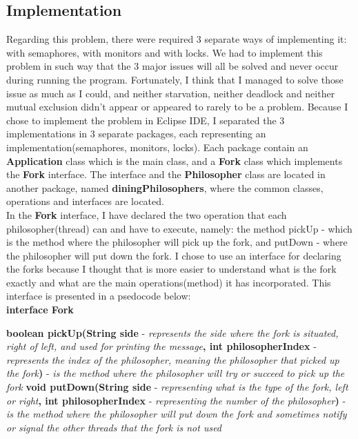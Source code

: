 \documentclass[14pt]{article}
\begin{document}
\subsection{Implementation}
Regarding this problem, there were required 3 separate ways of implementing it: with semaphores, with monitors and with locks. We had to implement this problem in such way that the 3 major issues will all be solved and never occur during running the program. Fortunately, I think that I managed to solve those issue as much as I could, and neither starvation, neither deadlock and neither mutual exclusion didn't appear or appeared to rarely to be a problem. Because I chose to implement the problem in Eclipse IDE, I separated the 3 implementations in 3 separate packages, each representing an implementation(semaphores, monitors, locks). Each package contain an \textbf{Application} class which is the main class, and a \textbf{Fork} class which implements the \textbf{Fork} interface. The interface and the \textbf{Philosopher} class are located in another package, named \textbf{diningPhilosophers}, where the common classes, operations and interfaces are located.
\\In the \textbf{Fork} interface, I have declared the two operation that each philosopher(thread) can and have to execute, namely: the method pickUp - which is the method where the philosopher will pick up the fork, and putDown - where the philosopher will put down the fork. I chose to use an interface for declaring the forks because I thought that is more easier to understand what is the fork exactly and what are the main operations(method) it has incorporated. This interface is presented in a psedocode below:
\vspace{2.5 mm}
\\\textbf{interface Fork}
\begin{algorithmic}
\State \textbf{boolean pickUp(String side} - \textit{represents the side where the fork is situated, right of left, and used for printing the message}\textbf{, int philosopherIndex} - \textit{represents the index of the philosopher, meaning the philosopher that picked up the fork}\textbf{)} - \textit{is the method where the philosopher will try or succeed to pick up the fork}
\State \textbf{void putDown(String side} - \textit{representing what is the type of the fork, left or right}\textbf{, int philosopherIndex} - \textit{representing the number of the philosopher}\textbf{)} - \textit{is the method where the philosopher will put down the fork and sometimes notify or signal the other threads that the fork is not used}
\end{algorithmic}
\end{document}
